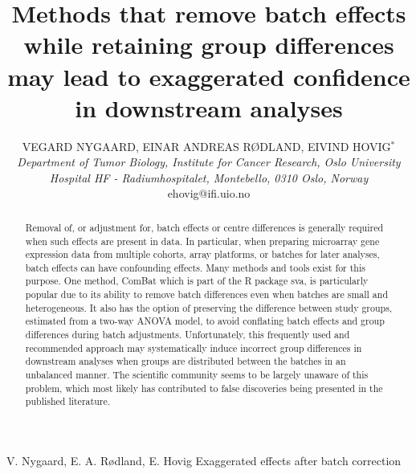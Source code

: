 \documentclass{bio}
\begin{document}

\title{Methods that remove batch effects while retaining group differences may lead
to exaggerated confidence in downstream analyses
}

\author{VEGARD NYGAARD, EINAR ANDREAS RØDLAND, EIVIND HOVIG$^\ast$\\[4pt]
\textit{Department of Tumor Biology,
Institute for Cancer Research,
Oslo University Hospital HF - Radiumhospitalet,
Montebello,
0310 Oslo,
Norway}
\\[2pt]
{ehovig@ifi.uio.no}}

\markboth%
{V. Nygaard, E. A. Rødland, E. Hovig}
{Exaggerated effects after batch correction}


\maketitle



\begin{abstract}
{Removal of, or adjustment for, batch effects or centre differences is generally required when such effects are present in data. In particular, when preparing microarray gene expression data from multiple cohorts, array platforms, or batches for later analyses, batch effects can have confounding effects. Many methods and tools exist for this purpose. One method, ComBat which is part of the R package sva, is particularly popular due to its ability to remove batch differences even when batches are small and heterogeneous. It also has the option of preserving the difference between study groups, estimated from a two-way ANOVA model, to avoid conflating batch effects and group differences during batch adjustments. Unfortunately, this frequently used and recommended approach may systematically induce incorrect group differences in downstream analyses when groups are distributed between the batches in an unbalanced manner. The scientific community seems to be largely unaware of this problem, which most likely has contributed to false discoveries being presented in the published literature.
}
\end{abstract}
\end{document}
